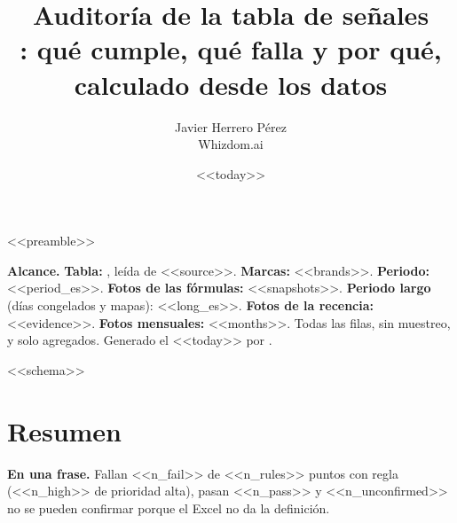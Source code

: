 <<preamble>>
\newcommand{\auditpoint}[6]{%
  \needspace{7\baselineskip}\item\label{#1}\textbf{#2}\par
  \begin{tabular}{@{}p{2.3cm}@{}p{\dimexpr\linewidth-2.3cm}@{}}
    \textcolor{MidnightBlue}{\textbf{Resultado}} & #3\\[2pt]
    \if\relax\detokenize{#4}\relax\else\textcolor{Plum}{\textbf{Definición}} & #4\\[2pt]\fi
    \if\relax\detokenize{#5}\relax\else\textcolor{ForestGreen!70!black}{\textbf{Propuesta}} & #5\\[2pt]\fi
    \if\relax\detokenize{#6}\relax\else\textcolor{MidnightBlue}{\textbf{Pruebas}} & #6\fi
  \end{tabular}\par\vspace{5pt}}

\title{\textbf{Auditoría de la tabla de señales}\\[2pt]\large{}: qué cumple, qué falla y por qué, calculado desde los datos}
\date{<<today>>}
\author{Javier Herrero Pérez \\ Whizdom.ai}


\maketitle
\vspace{-1.2cm}

\textbf{Alcance.} \textbf{Tabla:} , leída de <<source>>. \textbf{Marcas:} <<brands>>. \textbf{Periodo:} <<period_es>>. \textbf{Fotos de las fórmulas:} <<snapshots>>. \textbf{Periodo largo} (días congelados y mapas): <<long_es>>. \textbf{Fotos de la recencia:} <<evidence>>. \textbf{Fotos mensuales:} <<months>>. Todas las filas, sin muestreo, y solo agregados. Generado el <<today>> por .

<<schema>>

\section{Resumen}\label{sec:summary}
\textbf{En una frase.} Fallan <<n_fail>> de <<n_rules>> puntos con regla (<<n_high>> de prioridad alta), pasan <<n_pass>> y <<n_unconfirmed>> no se pueden confirmar porque el Excel no da la definición.

\begin{center}

\end{center}

